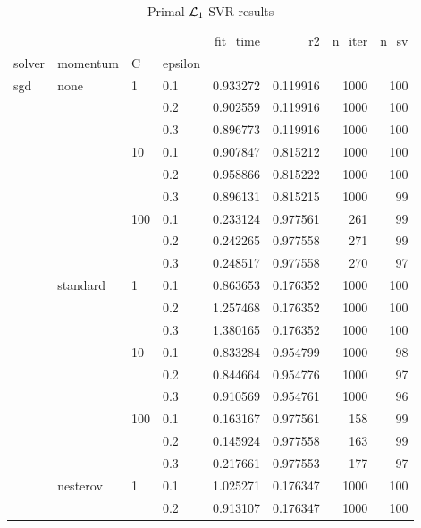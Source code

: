 \begin{table}[H]
\centering
\caption{Primal $\protect \mathcal{L}_1$-SVR results}
\label{primal_l1_svr_cv_results}
\begin{tabular}{llllrrrr}
\toprule
          &   &     &     &  fit\_time &        r2 &  n\_iter &  n\_sv \\
solver & momentum & C & epsilon &           &           &         &       \\
\midrule
sgd & none & 1   & 0.1 &  0.933272 &  0.119916 &    1000 &   100 \\
          &   &     & 0.2 &  0.902559 &  0.119916 &    1000 &   100 \\
          &   &     & 0.3 &  0.896773 &  0.119916 &    1000 &   100 \\
          &   & 10  & 0.1 &  0.907847 &  0.815212 &    1000 &   100 \\
          &   &     & 0.2 &  0.958866 &  0.815222 &    1000 &   100 \\
          &   &     & 0.3 &  0.896131 &  0.815215 &    1000 &    99 \\
          &   & 100 & 0.1 &  0.233124 &  0.977561 &     261 &    99 \\
          &   &     & 0.2 &  0.242265 &  0.977558 &     271 &    99 \\
          &   &     & 0.3 &  0.248517 &  0.977558 &     270 &    97 \\
          & standard & 1   & 0.1 &  0.863653 &  0.176352 &    1000 &   100 \\
          &   &     & 0.2 &  1.257468 &  0.176352 &    1000 &   100 \\
          &   &     & 0.3 &  1.380165 &  0.176352 &    1000 &   100 \\
          &   & 10  & 0.1 &  0.833284 &  0.954799 &    1000 &    98 \\
          &   &     & 0.2 &  0.844664 &  0.954776 &    1000 &    97 \\
          &   &     & 0.3 &  0.910569 &  0.954761 &    1000 &    96 \\
          &   & 100 & 0.1 &  0.163167 &  0.977561 &     158 &    99 \\
          &   &     & 0.2 &  0.145924 &  0.977558 &     163 &    99 \\
          &   &     & 0.3 &  0.217661 &  0.977553 &     177 &    97 \\
          & nesterov & 1   & 0.1 &  1.025271 &  0.176347 &    1000 &   100 \\
          &   &     & 0.2 &  0.913107 &  0.176347 &    1000 &   100 \\

\end{tabular}
\end{table}

